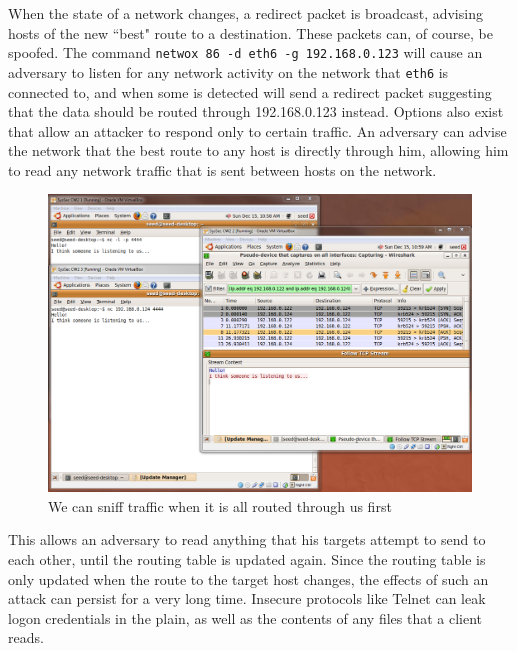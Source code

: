 When the state of a network changes, a redirect packet is broadcast, advising hosts of the new ``best" route to a
destination. These packets can, of course, be spoofed. The command {\tt netwox 86 -d eth6 -g 192.168.0.123} will cause
an adversary to listen for any network activity on the network that {\tt eth6} is connected to, and when some is
detected will send a redirect packet suggesting that the data should be routed through 192.168.0.123 instead. Options
also exist that allow an attacker to respond only to certain traffic. An adversary can advise the network that the best
route to any host is directly through him, allowing him to read any network traffic that is sent between hosts on the
network.



\begin{figure}[h]
    \centering
    \includegraphics[width=.7\linewidth]{images/icmp_redirect_after.png}
    \caption{We can sniff traffic when it is all routed through us first} \label{fig:icmp_after}
\end{figure}

This allows an adversary to read anything that his targets attempt to send to each other, until the routing table is
updated again. Since the routing table is only updated when the route to the target host changes, the effects of such an
attack can persist for a very long time. Insecure protocols like Telnet can leak logon credentials in the plain, as well
as the contents of any files that a client reads.


